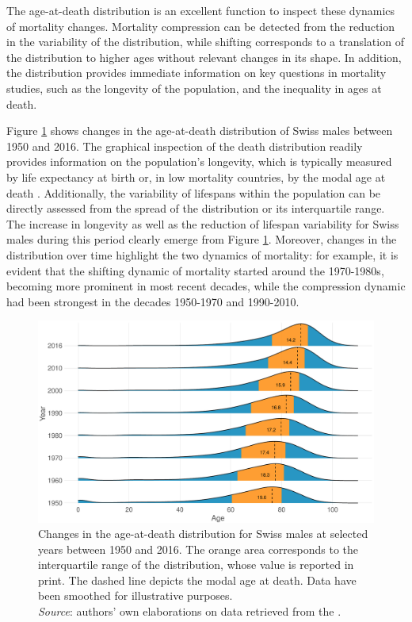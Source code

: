 \documentclass[11pt, a4paper]{article}
\begin{document}
The age-at-death distribution is an excellent function to inspect these dynamics of mortality changes. Mortality compression can be detected from the reduction in the variability of the distribution, while shifting corresponds to a translation of the distribution to higher ages without relevant changes in its shape. In addition, the distribution provides immediate information on key questions in mortality studies, such as the longevity of the population, and the inequality in ages at death.

Figure \ref{Fig:Intro} shows changes in the age-at-death distribution of Swiss males between 1950 and 2016. The graphical inspection of the death distribution readily provides information on the population's longevity, which is typically measured by life expectancy at birth or, in low mortality countries, by the modal age at death \citep{kannisto2001mode,horiuchi2013modal}. Additionally, the variability of lifespans within the population can be directly assessed from the spread of the distribution or its interquartile range. The increase in longevity as well as the reduction of lifespan variability for Swiss males during this period clearly emerge from Figure \ref{Fig:Intro}. Moreover, changes in the distribution over time highlight the two dynamics of mortality: for example, it is evident that the shifting dynamic of mortality started around the 1970-1980s, becoming more prominent in most recent decades, while the compression dynamic had been strongest in the decades {\color{red}1950-1970 and 1990-2010}.
  
\begin{figure}[t]
	\begin{center}
		\includegraphics[scale=0.55]{./Figures/F1.pdf}
		\caption{Changes in the age-at-death distribution for Swiss males at selected years between 1950 and 2016. The orange area corresponds to the interquartile range of the distribution, whose value is reported in print. The dashed line depicts the modal age at death. Data have been smoothed for illustrative purposes.\\\footnotesize{\textit{Source}: authors' own elaborations on data retrieved from the \cite{HMD}.} \label{Fig:Intro}}		
	\end{center}
\end{figure}
\end{document}

